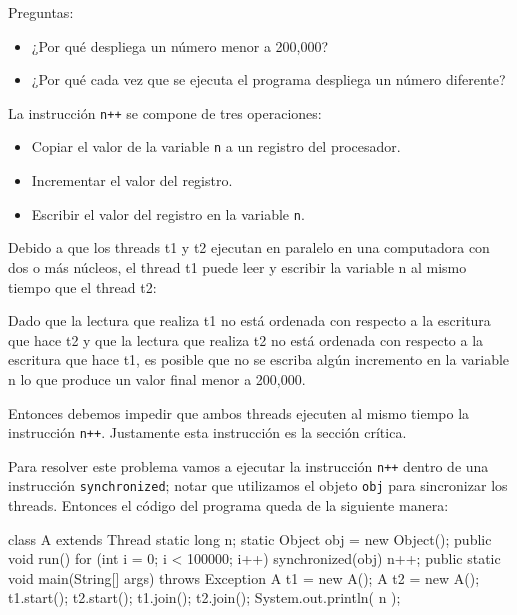 \documentclass[11pt,a4paper,oneside]{book}
\begin{document}
Preguntas:

\begin{itemize}

\item ¿Por qué despliega un número menor a 200,000?

\item ¿Por qué cada vez que se ejecuta el programa despliega un número diferente?

\end{itemize}

La instrucción \texttt{n++} se compone de tres operaciones:

\begin{itemize}

\item Copiar el valor de la variable \texttt{n} a un registro del procesador.

\item Incrementar el valor del registro.

\item Escribir el valor del registro en la variable \texttt{n}.

\end{itemize}

Debido a que los threads t1 y t2 ejecutan en paralelo en una computadora con dos o más núcleos, el thread t1 puede leer y escribir la variable n al mismo tiempo que el thread t2:

Dado que la lectura que realiza t1 no está ordenada con respecto a la escritura que hace t2 y que la lectura que realiza t2 no está ordenada con respecto a la escritura que hace t1, es posible que no se escriba algún incremento en la variable n lo que produce un valor final menor a 200,000.

Entonces debemos impedir que ambos threads ejecuten al mismo tiempo la instrucción \texttt{n++}. Justamente esta instrucción es la sección crítica.

Para resolver este problema vamos a ejecutar la instrucción \texttt{n++} dentro de una instrucción \texttt{synchronized}; notar que utilizamos el objeto \texttt{obj} para sincronizar los threads.
Entonces el código del programa queda de la siguiente manera:

\begin{SourceCode}
class A extends Thread
{
  static long n;
  static Object obj = new Object();
  public void run()
  {
    for (int i = 0; i < 100000; i++)
      synchronized(obj)
      {
        n++;
      }
  }
  public static void main(String[] args) throws Exception
  {
    A t1 = new A();
    A t2 = new A();
    t1.start();
    t2.start();
    t1.join();
    t2.join();
    System.out.println( n );
  }
}
\end{SourceCode}
\end{document}
